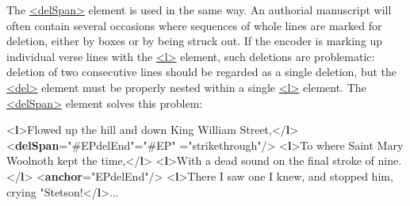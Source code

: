 The \hyperref[TEI.delSpan]{<delSpan>} element is used in the same way. An authorial manuscript will often contain  several occasions where sequences of whole lines are marked for deletion, either by boxes or by being struck out. If the encoder is marking up individual verse lines with the \hyperref[TEI.l]{<l>} element, such deletions are problematic: deletion of two consecutive lines should be regarded as a single deletion, but the \hyperref[TEI.del]{<del>} element must be properly nested within a single \hyperref[TEI.l]{<l>} element. The \hyperref[TEI.delSpan]{<delSpan>} element solves this problem: \par\bgroup{}\exampleFont \begin{shaded}\noindent\mbox{}{<\textbf{l}>}Flowed up the hill and down King William Street,{</\textbf{l}>}\mbox{}\newline 
{<\textbf{delSpan}\hspace*{1em}{spanTo}="{\#EPdelEnd}"\hspace*{1em}{resp}="{\#EP}"\mbox{}\newline 
\hspace*{1em}{rend}="{strikethrough}"/>}\mbox{}\newline 
{<\textbf{l}>}To where Saint Mary Woolnoth kept the time,{</\textbf{l}>}\mbox{}\newline 
{<\textbf{l}>}With a dead sound on the final stroke of nine.{</\textbf{l}>}\mbox{}\newline 
{<\textbf{anchor}\hspace*{1em}{xml:id}="{EPdelEnd}"/>}\mbox{}\newline 
{<\textbf{l}>}There I saw one I knew, and stopped him, crying "Stetson!{</\textbf{l}>}... \end{shaded}\egroup\par \par
